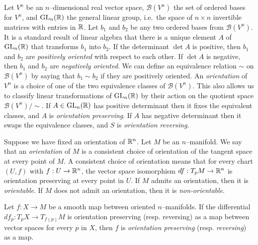 \begin{defn}
	\label{def:orientation}
	Let $V^n$ be an $n$--dimensional real vector space, $\mathcal{B}(V^n)$ the set of ordered bases for $V^n$, and $\textrm{GL}_{n}(\mathbb{R})$ the general linear group, i.e.\ the space of $n\times n$ invertible matrices with entries in $\mathbb{R}$.
	Let $b_1$ and $b_2$ be any two ordered bases from $\mathcal{B}(V^n)$.
	It is a standard result of linear algebra that there is a unique element $A$ of $\textrm{GL}_{n}(\mathbb{R})$ that transforms $b_1$ into $b_2$.
	If the determinant $\det A$ is positive, then $b_1$ and $b_2$ are \emph{positively oriented} with respect to each other.
	If $\det A$ is negative, then $b_1$ and $b_2$ are \emph{negatively oriented}.
	We can define an equivalence relation $\sim$ on $\mathcal{B}(V^n)$ by saying that $b_1\sim b_2$ if they are positively oriented.
	An \emph{orientation} of $V^n$ is a choice of one of the two equivalence classes of $\mathcal{B}(V^n)$.
	This also allows us to classify linear transformations of $\textrm{GL}_{n}(\mathbb{R})$ by their action on the quotient space $\mathcal{B}(V^n)/\sim$.
	If $A\in\textrm{GL}_{n}(\mathbb{R})$ has positive determinant then it fixes the equivalent classes, and $A$ is \emph{orientation preserving}.
	If $A$ has negative determinant then it swaps the equivalence classes, and $S$ is \emph{orientation reversing}.
\end{defn}



\begin{defn}
	Suppose we have fixed an orientation of $\mathbb{R}^n$.
	Let $M$ be an $n$--manifold.
	We say that an \emph{orientation} of $M$ is a consistent choice of orientation of the tangent space at every point of $M$.
	A consistent choice of orientation means that for every chart $(U,f)$ with $f:U\to\mathbb{R}^n$, the vector space isomorphism $df:T_p M\to \mathbb{R}^n$ is orientation preserving at every point in $U$. 
	If $M$ admits an orientation, then it is \emph{orientable}.
	If $M$ does not admit an orientation, then it is \emph{non-orientable}.	
\end{defn}



\begin{defn}
	Let $f:X\to M$ be a smooth map between oriented $n$--manifolds.
	If the differential $df_p:T_p X\to T_{f(p)} M$ is orientation preserving (resp. reversing) as a map between vector spaces for every $p$ in $X$, then $f$ is \emph{orientation preserving} (resp. \emph{reversing}) as a map.
\end{defn}
